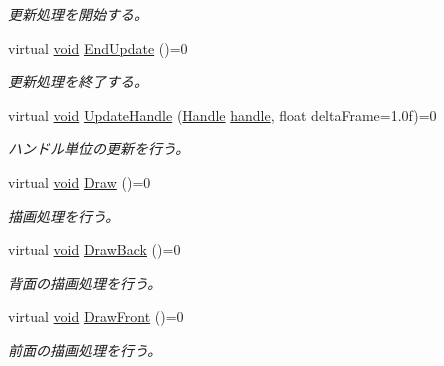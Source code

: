 \begin{DoxyCompactItemize}
\begin{DoxyCompactList}\small\item\em 更新処理を開始する。 \end{DoxyCompactList}\item 
virtual \mbox{\hyperlink{namespace_effekseer_ab34c4088e512200cf4c2716f168deb56}{void}} \mbox{\hyperlink{class_effekseer_1_1_manager_a49311566caa5abcbff1b836473b046ab}{End\+Update}} ()=0
\begin{DoxyCompactList}\small\item\em 更新処理を終了する。 \end{DoxyCompactList}\item 
virtual \mbox{\hyperlink{namespace_effekseer_ab34c4088e512200cf4c2716f168deb56}{void}} \mbox{\hyperlink{class_effekseer_1_1_manager_afe8a0df796e161f68a511540c76df839}{Update\+Handle}} (\mbox{\hyperlink{namespace_effekseer_afba58b8d812da862190e9bbfc040824a}{Handle}} \mbox{\hyperlink{namespace_effekseer_afd99b336b206999bdcca3e431648efbc}{handle}}, float delta\+Frame=1.\+0f)=0
\begin{DoxyCompactList}\small\item\em ハンドル単位の更新を行う。 \end{DoxyCompactList}\item 
virtual \mbox{\hyperlink{namespace_effekseer_ab34c4088e512200cf4c2716f168deb56}{void}} \mbox{\hyperlink{class_effekseer_1_1_manager_a17431b7d96325535fa62bcbb066f0a9c}{Draw}} ()=0
\begin{DoxyCompactList}\small\item\em 描画処理を行う。 \end{DoxyCompactList}\item 
virtual \mbox{\hyperlink{namespace_effekseer_ab34c4088e512200cf4c2716f168deb56}{void}} \mbox{\hyperlink{class_effekseer_1_1_manager_abcb4f71e94b1ff2ee3b8088fc53f4841}{Draw\+Back}} ()=0
\begin{DoxyCompactList}\small\item\em 背面の描画処理を行う。 \end{DoxyCompactList}\item 
virtual \mbox{\hyperlink{namespace_effekseer_ab34c4088e512200cf4c2716f168deb56}{void}} \mbox{\hyperlink{class_effekseer_1_1_manager_a44504a565c73f56ab6ddd8b90648d6fc}{Draw\+Front}} ()=0
\begin{DoxyCompactList}\small\item\em 前面の描画処理を行う。 \end{DoxyCompactList}\item 

\end{DoxyCompactItemize}
